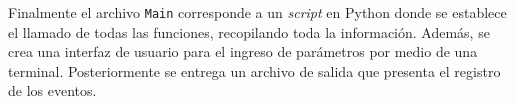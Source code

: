  

Finalmente el archivo \texttt{Main} corresponde a un \textit{script} en Python donde se establece el llamado de todas las funciones, recopilando toda la información.
Además, se crea una interfaz de usuario para el ingreso de parámetros por medio de una terminal.
Posteriormente se entrega un archivo de salida que presenta el registro de los eventos.





